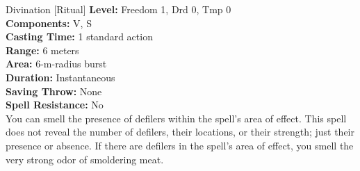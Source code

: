 {Divination [Ritual]}
{
	\textbf{Level:}
	Freedom 1, Drd 0, Tmp 0\\
	\textbf{Components:}
	V, S\\
	\textbf{Casting Time:}
	1 standard action\\
	\textbf{Range:}
	6 meters\\
	\textbf{Area:}
	6-m-radius burst\\
	\textbf{Duration:}
	Instantaneous\\
	\textbf{Saving Throw:}
	None\\
	\textbf{Spell Resistance:}
	No\\
}
{
	You can smell the presence of defilers within the spell's area of effect. This spell does not reveal the number of defilers, their locations, or their strength; just their presence or absence. If there are defilers in the spell's area of effect, you smell the very strong odor of smoldering meat.
}
